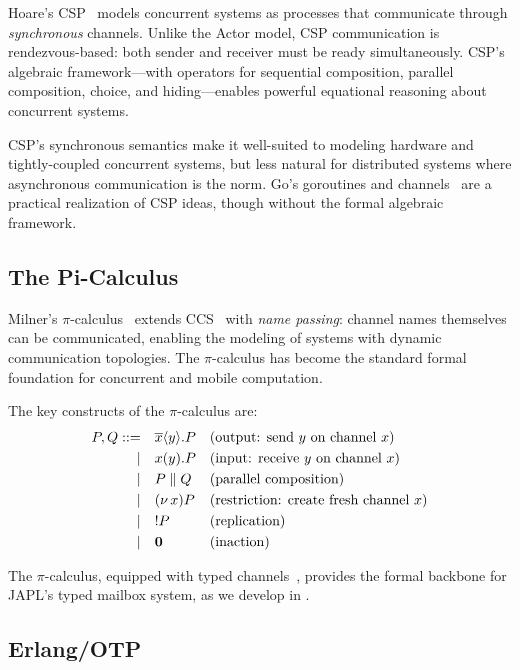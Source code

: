 \documentclass[11pt,a4paper]{article}
\newcommand{\ppar}{\;\|\;}
\newcommand{\pzero}{\mathbf{0}}
\newcommand{\prepl}{!}
\newcommand{\pnew}[1]{(\nu\, #1)}
\newcommand{\psend}[2]{\overline{#1}\langle #2 \rangle}
\newcommand{\precv}[2]{#1(#2)}
\begin{document}
Hoare's CSP~\citep{hoare1978communicating,roscoe1998theory} models concurrent systems as processes that communicate through \emph{synchronous} channels. Unlike the Actor model, CSP communication is rendezvous-based: both sender and receiver must be ready simultaneously. CSP's algebraic framework---with operators for sequential composition, parallel composition, choice, and hiding---enables powerful equational reasoning about concurrent systems.

CSP's synchronous semantics make it well-suited to modeling hardware and tightly-coupled concurrent systems, but less natural for distributed systems where asynchronous communication is the norm. Go's goroutines and channels~\citep{pike2012concurrency} are a practical realization of CSP ideas, though without the formal algebraic framework.

\subsection{The Pi-Calculus}

Milner's $\pi$-calculus~\citep{milner1992calculus,milner1999communicating} extends CCS~\citep{milner1980calculus} with \emph{name passing}: channel names themselves can be communicated, enabling the modeling of systems with dynamic communication topologies. The $\pi$-calculus has become the standard formal foundation for concurrent and mobile computation.

The key constructs of the $\pi$-calculus are:
\begin{align}
P, Q ::= \quad & \psend{x}{y}.P && \text{(output: send $y$ on channel $x$)} \notag \\
\mid \quad & \precv{x}{y}.P && \text{(input: receive $y$ on channel $x$)} \notag \\
\mid \quad & P \ppar Q && \text{(parallel composition)} \notag \\
\mid \quad & \pnew{x} P && \text{(restriction: create fresh channel $x$)} \notag \\
\mid \quad & \prepl P && \text{(replication)} \notag \\
\mid \quad & \pzero && \text{(inaction)} \notag
\end{align}

The $\pi$-calculus, equipped with typed channels~\citep{vasconcelos1998language}, provides the formal backbone for JAPL's typed mailbox system, as we develop in .

\subsection{Erlang/OTP}
\end{document}
